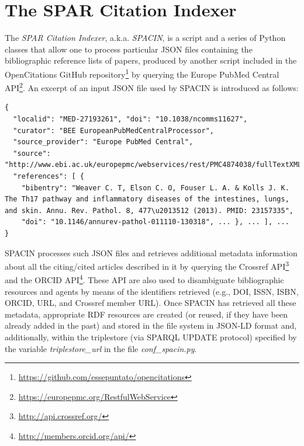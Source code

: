 \documentclass[runningheads,a4paper]{llncs}
\begin{document}
\section{The SPAR Citation Indexer}

The {\em SPAR Citation Indexer}, a.k.a. {\em SPACIN}, is a script and a series of Python classes that allow one to process particular JSON files containing the bibliographic reference lists of papers, produced by another script included in the OpenCitations GitHub repository\footnote{\url{https://github.com/essepuntato/opencitations}} by querying the Europe PubMed Central API\footnote{\url{https://europepmc.org/RestfulWebService}}. An excerpt of an input JSON file used by SPACIN is introduced as follows:

\begin{lstlisting}[mathescape]
{
  "localid": "MED-27193261", "doi": "10.1038/ncomms11627", 
  "curator": "BEE EuropeanPubMedCentralProcessor", 
  "source_provider": "Europe PubMed Central", 
  "source": "http://www.ebi.ac.uk/europepmc/webservices/rest/PMC4874038/fullTextXML", 
  "references": [ {
    "bibentry": "Weaver C. T, Elson C. O, Fouser L. A. & Kolls J. K. The Th17 pathway and inflammatory diseases of the intestines, lungs, and skin. Annu. Rev. Pathol. 8, 477\u2013512 (2013). PMID: 23157335", 
    "doi": "10.1146/annurev-pathol-011110-130318", ... }, ... ], ... 
}
\end{lstlisting}

SPACIN processes such JSON files and retrieves additional metadata information about all the citing/cited articles described in it by querying the Crossref API\footnote{\url{http://api.crossref.org/}} and the ORCID API\footnote{\url{http://members.orcid.org/api/}}. These API are also used to disambiguate bibliographic resources and agents by means of the identifiers retrieved (e.g., DOI, ISSN, ISBN, ORCID, URL, and Crossref member URL). Once SPACIN has retrieved all these metadata, appropriate RDF resources are created (or reused, if they have been already added in the past) and stored in the file system in JSON-LD format and, additionally, within the triplestore (via SPARQL UPDATE protocol) specified by the variable {\em triplestore\_url} in the file {\em conf\_spacin.py}.
\end{document}
